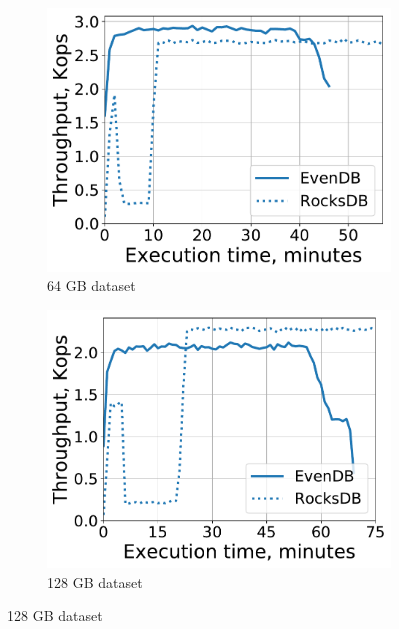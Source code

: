 \begin{figure}[tb]
\centering
\begin{subfigure}{0.32\linewidth}
\includegraphics[width=\textwidth]{figs/throughput_64_scans_10s_line.pdf}
\caption{64 GB dataset}
\label{fig:prod:analytics:a}
\end{subfigure}
\begin{subfigure}{0.32\linewidth}
\includegraphics[width=\textwidth]{figs/throughput_128_scans_10s_line.pdf}
\caption{128 GB dataset}
\label{fig:prod:analytics:b}
\end{subfigure}

\end{figure}
